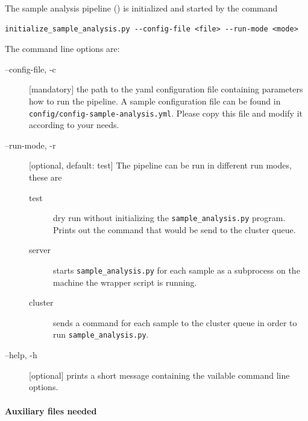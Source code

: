 \documentclass[a4paper]{article}
\begin{document}
The sample analysis pipeline () is
initialized and started by the command

\begin{lstlisting}
initialize_sample_analysis.py --config-file <file> --run-mode <mode>
\end{lstlisting}

The command line options are:

\begin{description}
\item[--config-file, -c] [mandatory] the path to the yaml
  configuration file containing parameters how to run the pipeline. A
  sample configuration file can be found in
  \texttt{config/config-sample-analysis.yml}. Please copy this file
  and modify it according to your needs.
\item[--run-mode, -r] [optional, default: test] The pipeline can be
  run in different run modes, these are 

  \begin{description}
  \item[test] dry run without initializing the
    \texttt{sample\_analysis.py} program. Prints out the command
    that would be send to the cluster queue.
  \item[server] starts \texttt{sample\_analysis.py} for each
    sample as a subprocess on the machine the wrapper script is
    running.
  \item[cluster] sends a command for each sample to the cluster queue
    in order to run \texttt{sample\_analysis.py}.
  \end{description}
    
\item[--help, -h] [optional] prints a short message containing the
  vailable command line options.
\end{description}


\paragraph{Auxiliary files needed}
\end{document}
